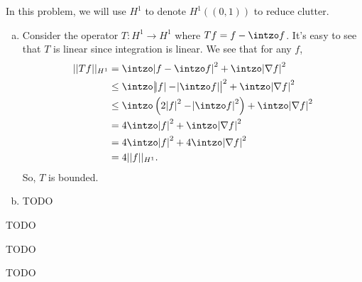 \documentclass{article}
\newcommand{\D}{\nabla}
\begin{document}
\newpage
{} 
 \tri
\hop 
\solution
In this problem, we will use $H^1$ to denote $H^1((0,1))$ to reduce clutter.
\begin{enumerate}[(a)]
    \item Consider the operator $T: H^1 \to H^1$ where $Tf = f - \intzo f$. It's easy to see that $T$ is linear since integration is linear. We see that for any $f$, %
    \begin{align*}
        ||Tf||_{H^1} &= \intzo \abs{f - \intzo f}^2 + \intzo \abs{\D f}^2 \\
        &\le  \intzo \abs{\abs{f} - \abs{\intzo f}}^2 + \intzo \abs{\D f} ^2\\
        &\le  \intzo \del{2\abs{f}^2 - \abs{\intzo f}^2} + \intzo \abs{\D f}^2 \\
        &=  4\intzo \abs{f}^2 + \intzo \abs{\D f}^2 \\
        &=  4\intzo \abs{f}^2 + 4\intzo \abs{\D f}^2 \\
        &= 4||f||_{H^1}.
    \end{align*}
    So, $T$ is bounded.
    \item TODO
\end{enumerate}

\newpage
{} 
 \tri
\hop 
\solution
TODO

\newpage
{} 
 \tri
\hop 
\solution
TODO

\newpage
{} 
 \tri
\hop 
\solution
TODO
\end{document}

